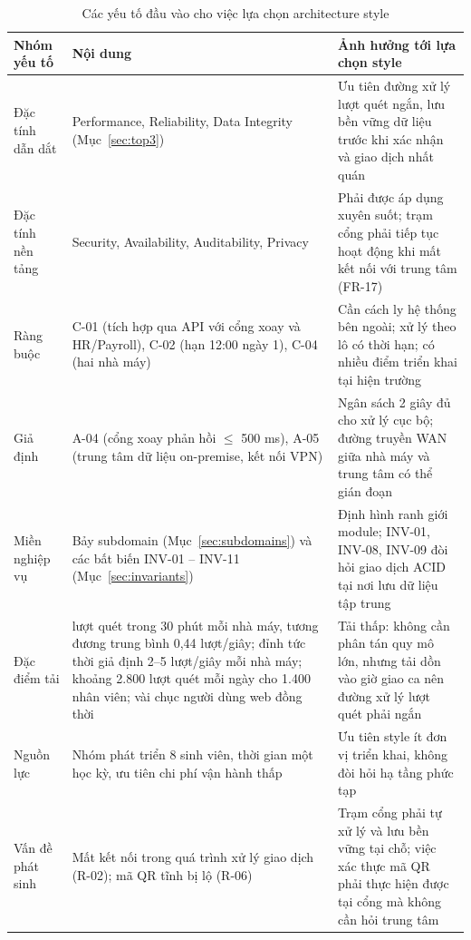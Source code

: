 \begin{table}[H]
\centering
\caption{Các yếu tố đầu vào cho việc lựa chọn architecture style}\label{tab:style-inputs}
\small
\renewcommand{\arraystretch}{1.3}
\begin{tabularx}{\textwidth}{|>{\raggedright\arraybackslash}p{2.8cm}|>{\raggedright\arraybackslash}X|>{\raggedright\arraybackslash}X|}
\hline
\textbf{Nhóm yếu tố} & \textbf{Nội dung} & \textbf{Ảnh hưởng tới lựa chọn style} \\
\hline
Đặc tính dẫn dắt & Performance, Reliability, Data Integrity (Mục~\ref{sec:top3}) & Ưu tiên đường xử lý lượt quét ngắn, lưu bền vững dữ liệu trước khi xác nhận và giao dịch nhất quán \\
\hline
Đặc tính nền tảng & Security, Availability, Auditability, Privacy & Phải được áp dụng xuyên suốt; trạm cổng phải tiếp tục hoạt động khi mất kết nối với trung tâm (FR-17) \\
\hline
Ràng buộc & C-01 (tích hợp qua API với cổng xoay và HR/Payroll), C-02 (hạn 12:00 ngày 1), C-04 (hai nhà máy) & Cần cách ly hệ thống bên ngoài; xử lý theo lô có thời hạn; có nhiều điểm triển khai tại hiện trường \\
\hline
Giả định & A-04 (cổng xoay phản hồi $\le$ 500 ms), A-05 (trung tâm dữ liệu on-premise, kết nối VPN) & Ngân sách 2 giây đủ cho xử lý cục bộ; đường truyền WAN giữa nhà máy và trung tâm có thể gián đoạn \\
\hline
Miền nghiệp vụ & Bảy subdomain (Mục~\ref{sec:subdomains}) và các bất biến INV-01 -- INV-11 (Mục~\ref{sec:invariants}) & Định hình ranh giới module; INV-01, INV-08, INV-09 đòi hỏi giao dịch ACID tại nơi lưu dữ liệu tập trung \\
\hline
Đặc điểm tải & 800 lượt quét trong 30 phút mỗi nhà máy, tương đương trung bình 0,44 lượt/giây; đỉnh tức thời giả định 2--5 lượt/giây mỗi nhà máy; khoảng 2.800 lượt quét mỗi ngày cho 1.400 nhân viên; vài chục người dùng web đồng thời & Tải thấp: không cần phân tán quy mô lớn, nhưng tải dồn vào giờ giao ca nên đường xử lý lượt quét phải ngắn \\
\hline
Nguồn lực & Nhóm phát triển 8 sinh viên, thời gian một học kỳ, ưu tiên chi phí vận hành thấp & Ưu tiên style ít đơn vị triển khai, không đòi hỏi hạ tầng phức tạp \\
\hline
Vấn đề phát sinh & Mất kết nối trong quá trình xử lý giao dịch (R-02); mã QR tĩnh bị lộ (R-06) & Trạm cổng phải tự xử lý và lưu bền vững tại chỗ; việc xác thực mã QR phải thực hiện được tại cổng mà không cần hỏi trung tâm \\
\hline
\end{tabularx}
\end{table}

